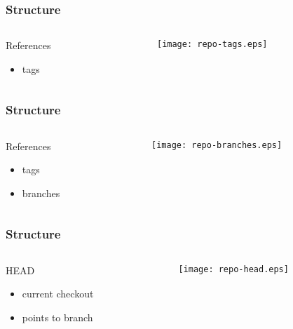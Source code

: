 \documentclass[english]{beamer}
\begin{document}
\begin{frame}
\frametitle{Structure}
\begin{columns}[t]
        \begin{column}[T]{.5\textwidth}
                References
                \begin{itemize}
                        \item tags
                \end{itemize}
        \end{column}
        \begin{column}[T]{.5\textwidth}
                \texttt{[image: repo-tags.eps]}
        \end{column}
\end{columns}

\end{frame}

\begin{frame}
\frametitle{Structure}
\begin{columns}[t]
        \begin{column}[T]{.5\textwidth}
                References
                \begin{itemize}
                        \item tags
                        \item branches
                \end{itemize}
        \end{column}
        \begin{column}[T]{.5\textwidth}
                \texttt{[image: repo-branches.eps]}
        \end{column}
\end{columns}

\end{frame}

\begin{frame}
\frametitle{Structure}
\begin{columns}[t]
        \begin{column}[T]{.5\textwidth}
                HEAD
                \begin{itemize}
                        \item current checkout
                        \item points to branch
                \end{itemize}
        \end{column}
        \begin{column}[T]{.5\textwidth}
                \texttt{[image: repo-head.eps]}
        \end{column}
\end{columns}

\end{frame}
\end{document}
